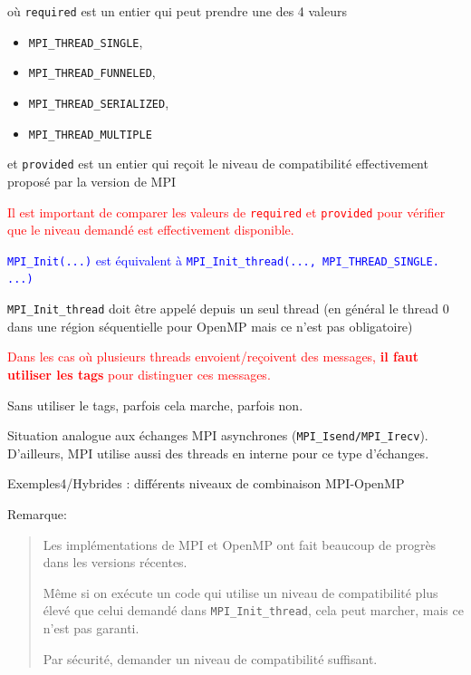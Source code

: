 \documentclass{beamer}
\begin{document}
\begin{frame}[fragile]
	où {\tt required} est un entier qui peut prendre une des 4 valeurs \begin{itemize}
		\item {\tt MPI\_THREAD\_SINGLE},
		\item {\tt MPI\_THREAD\_FUNNELED},
		\item {\tt MPI\_THREAD\_SERIALIZED},
		\item {\tt MPI\_THREAD\_MULTIPLE}
	\end{itemize}   
	\vfill
	
	et {\tt provided} est un entier qui reçoit le niveau de compatibilité effectivement proposé par la version de MPI
	
	\vfill
	\textcolor{red}{Il est important de comparer les valeurs de {\tt required} et {\tt provided} pour vérifier que le niveau demandé est effectivement disponible.} 
	
	\vfill
	\textcolor{blue}{{\tt MPI\_Init(...)} est équivalent à {\tt MPI\_Init\_thread(..., MPI\_THREAD\_SINGLE. ...)}}
	
	\vfill
	\texttt{MPI\_Init\_thread} doit être appelé depuis un seul thread (en général le thread 0 dans une région séquentielle pour OpenMP mais
	ce n'est pas obligatoire)
\end{frame}

\begin{frame}
	\vfill
	\textcolor{red}{Dans les cas où plusieurs threads envoient/reçoivent des messages, \textbf{il faut utiliser les tags} pour distinguer ces messages.}
	\bigskip
	
	Sans utiliser le tags, parfois cela marche, parfois non.
	
	\medskip
	Situation analogue aux échanges MPI asynchrones (\texttt{MPI\_Isend/MPI\_Irecv}). D'ailleurs, MPI utilise aussi des threads en interne pour ce type d'échanges.
	\vfill
\end{frame}

\begin{frame}
	Exemples4/Hybrides : différents niveaux de combinaison MPI-OpenMP
	
	\vfill
	
	Remarque:
	\begin{quote}
		Les implémentations de MPI et OpenMP ont fait beaucoup de progrès dans les versions récentes.
		
	\bigskip
		Même si on exécute un code qui utilise un niveau de compatibilité plus élevé que celui demandé dans {\tt MPI\_Init\_thread}, cela peut marcher, mais ce n'est pas garanti.
		
	\bigskip
		Par sécurité, demander un niveau de compatibilité suffisant.
	\end{quote}

	\vfill
	
\end{frame}
\end{document}

